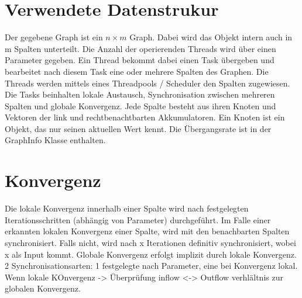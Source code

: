 \section{Verwendete Datenstrukur}
Der gegebene Graph ist ein $n\times m$ Graph. Dabei wird das Objekt intern auch in m Spalten unterteilt. Die Anzahl der operierenden Threads wird über einen Parameter gegeben. Ein Thread bekommt dabei einen Task übergeben und bearbeitet nach diesem Task eine oder mehrere Spalten des Graphen. Die Threads werden mittels eines Threadpools / Scheduler den Spalten zugewiesen. Die Tasks beinhalten lokale Austausch, Synchronisation zwischen mehreren Spalten und globale Konvergenz.
Jede Spalte besteht aus ihren Knoten und Vektoren der link und rechtbenachtbarten Akkumulatoren. 
Ein Knoten ist ein Objekt, das nur seinen aktuellen Wert kennt. Die Übergangsrate ist in der GraphInfo Klasse enthalten. 

\section{Konvergenz}
Die lokale Konvergenz innerhalb einer Spalte wird nach festgelegten Iterationsschritten (abhängig von Parameter) durchgeführt. Im Falle einer erkannten lokalen Konvergenz einer Spalte, wird mit den benachbarten Spalten synchronisiert. Falls nicht, wird nach x Iterationen definitiv synchronisiert, wobei x als Input kommt. 
Globale Konvergenz erfolgt implizit durch lokale Konvergenz. 
2 Synchronisationsarten: 1 festgelegte nach Parameter, eine bei Konvergenz lokal.
Wenn lokale KOnvergenz -> Überprüfung inflow <-> Outflow verhlältnis zur globalen Konvergenz. 


